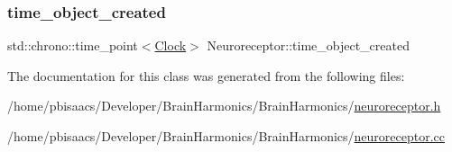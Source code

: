 \mbox{\label{classNeuroreceptor_a1ca4d66356d1e59850ea2d7591873ff5}} 
\subsubsection{\texorpdfstring{time\+\_\+object\+\_\+created}{time\_object\_created}}
{\footnotesize\ttfamily std\+::chrono\+::time\+\_\+point$<$\mbox{\hyperlink{universe_8h_a0ef8d951d1ca5ab3cfaf7ab4c7a6fd80}{Clock}}$>$ Neuroreceptor\+::time\+\_\+object\+\_\+created\hspace{0.3cm}{\ttfamily [private]}}



The documentation for this class was generated from the following files\+:\begin{DoxyCompactItemize}
\item 
/home/pbisaacs/\+Developer/\+Brain\+Harmonics/\+Brain\+Harmonics/\mbox{\hyperlink{neuroreceptor_8h}{neuroreceptor.\+h}}\item 
/home/pbisaacs/\+Developer/\+Brain\+Harmonics/\+Brain\+Harmonics/\mbox{\hyperlink{neuroreceptor_8cc}{neuroreceptor.\+cc}}\end{DoxyCompactItemize}
